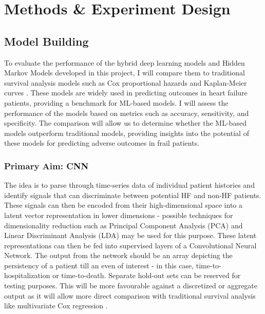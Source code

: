 \documentclass[%
 reprint,
 amsmath,amssymb,
 aps,
 nofootinbib,
]{revtex4-2}
\theoremstyle{definition}
\begin{document}
\section{\label{methods}Methods \& Experiment Design}

\subsection{\label{build}Model Building}
To evaluate the performance of the hybrid deep learning models and Hidden Markov Models developed in this project, I will compare them to traditional survival analysis models such as Cox proportional hazards \cite{kumar1994proportional} and Kaplan-Meier curves \cite{bland1998survival}. These models are widely used in predicting outcomes in heart failure patients, providing a benchmark for ML-based models. I will assess the performance of the models based on metrics such as accuracy, sensitivity, and specificity. The comparison will allow us to determine whether the ML-based models outperform traditional models, providing insights into the potential of these models for predicting adverse outcomes in frail patients.
\subsubsection{\label{prim}Primary Aim: CNN}
The idea is to parse through time-series data of individual patient histories and identify signals that can discriminate between potential HF and non-HF patients. These signals can then be encoded from their high-dimensional space into a latent vector representation in lower dimensions - possible techniques for dimensionality reduction such as Principal Component Analysis (PCA) \cite{PCA} and Linear Discriminant Analysis (LDA) \cite{xanthopoulos2013linear} may be used for this purpose. These latent representations can then be fed into supervised layers of a Convolutional Neural Network. The output from the network should be an array depicting the persistency of a patient till an even of interest - in this case, time-to-hospitalization or time-to-death. Separate hold-out sets can be reserved for testing purposes. This will be more favourable against a discretized or aggregate output as it will allow more direct comparison with traditional survival analysis like multivariate Cox regression \citep{lin1994cox}.
\end{document}
